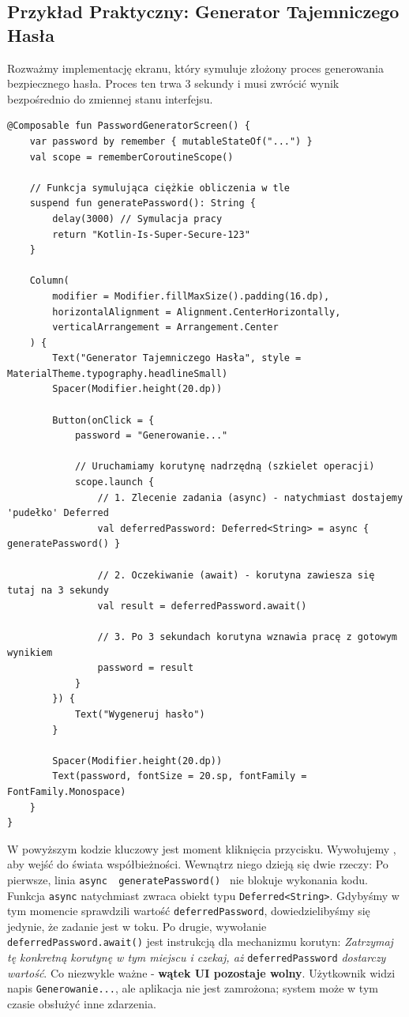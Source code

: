 \subsection{Przykład Praktyczny: Generator Tajemniczego Hasła} 
Rozważmy implementację ekranu, który symuluje złożony proces generowania bezpiecznego hasła. Proces ten trwa 3 sekundy i musi zwrócić wynik bezpośrednio do zmiennej stanu interfejsu.

\begin{verbatim}
@Composable fun PasswordGeneratorScreen() { 
    var password by remember { mutableStateOf("...") } 
    val scope = rememberCoroutineScope()

    // Funkcja symulująca ciężkie obliczenia w tle
    suspend fun generatePassword(): String {
        delay(3000) // Symulacja pracy
        return "Kotlin-Is-Super-Secure-123"
    }

    Column(
        modifier = Modifier.fillMaxSize().padding(16.dp),
        horizontalAlignment = Alignment.CenterHorizontally,
        verticalArrangement = Arrangement.Center
    ) {
        Text("Generator Tajemniczego Hasła", style = MaterialTheme.typography.headlineSmall)
        Spacer(Modifier.height(20.dp))

        Button(onClick = {
            password = "Generowanie..."
            
            // Uruchamiamy korutynę nadrzędną (szkielet operacji)
            scope.launch {
                // 1. Zlecenie zadania (async) - natychmiast dostajemy 'pudełko' Deferred
                val deferredPassword: Deferred<String> = async { generatePassword() }
                
                // 2. Oczekiwanie (await) - korutyna zawiesza się tutaj na 3 sekundy
                val result = deferredPassword.await()
                
                // 3. Po 3 sekundach korutyna wznawia pracę z gotowym wynikiem
                password = result
            }
        }) {
            Text("Wygeneruj hasło")
        }

        Spacer(Modifier.height(20.dp))
        Text(password, fontSize = 20.sp, fontFamily = FontFamily.Monospace)
    }
} 
\end{verbatim}

W powyższym kodzie kluczowy jest moment kliknięcia przycisku. Wywołujemy , aby wejść do świata współbieżności. Wewnątrz niego dzieją się dwie rzeczy: Po pierwsze, linia \texttt{async { generatePassword() }} nie blokuje wykonania kodu. Funkcja \texttt{async} natychmiast zwraca obiekt typu \texttt{Deferred<String>}. Gdybyśmy w tym momencie sprawdzili wartość \texttt{deferredPassword}, dowiedzielibyśmy się jedynie, że zadanie jest w toku. Po drugie, wywołanie \texttt{deferredPassword.await()} jest instrukcją dla mechanizmu korutyn: \textit{Zatrzymaj tę konkretną korutynę w tym miejscu i czekaj, aż} \texttt{deferredPassword} \textit{dostarczy wartość}. Co niezwykle ważne - \textbf{wątek UI pozostaje wolny}. Użytkownik widzi napis \texttt{Generowanie...}, ale aplikacja nie jest zamrożona; system może w tym czasie obsłużyć inne zdarzenia.

